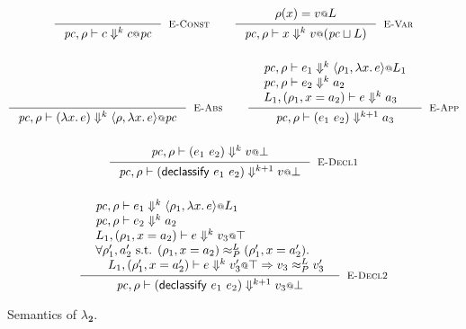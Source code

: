 \documentclass{article}
\makeatletter
\theoremstyle{definition}
\newcommand{\at}{\ensuremath{{\scriptstyle{@}}}}
\newcommand{\pc}{\ensuremath{{\mathit{pc}}}}
\makeatother
\begin{document}
\begin{figure}[ht]
  \centering
  \begin{gather*}
    \inference{}{
      \pc, \rho |- c \Downarrow^{k} c \at \pc
    }[\textsc{E-Const}]
    \qquad
    \inference{
      {\begin{array}{l}
          \rho(x) = v \at L
        \end{array}}
    }{
      \pc, \rho |- x \Downarrow^{k} v \at (\pc \sqcup L)
    }[\textsc{E-Var}]
    \\[3ex]
    \inference{}{
      \pc, \rho |- (\lambda{x}.\, e) \Downarrow^{k}
      \langle{\rho, \lambda{x}.\, e\rangle} \at \pc
    }[\textsc{E-Abs}]
    \qquad
    \inference{
      {\begin{array}{l}
          \pc, \rho |- e_1 \Downarrow^{k}
          \langle{\rho_1, \lambda{x}.\, e\rangle} \at L_1
          \\
          \pc, \rho |- e_2 \Downarrow^{k} a_2
          \\
          L_1, (\rho_1, x = a_2) |- e \Downarrow^{k} a_3
        \end{array}}
    }{
      \pc, \rho |- (e_1\ e_2) \Downarrow^{k+1} a_3
    }[\textsc{E-App}]
    \\[3ex]
    \inference{
      {\begin{array}{l}
          \pc, \rho |- (e_1\ e_2) \Downarrow^{k} v \at \bot
        \end{array}}
    }{
      \pc, \rho |- (\mathsf{declassify}\ e_1\ e_2) \Downarrow^{k+1}
      v \at \bot
    }[\textsc{E-Decl1}]
    \\[3ex]
    \inference{
      {\begin{array}{l}
          \pc, \rho |- e_1 \Downarrow^{k}
          \langle{\rho_1, \lambda{x}.\, e\rangle} \at L_1
          \\
          \pc, \rho |- e_2 \Downarrow^{k} a_2
          \\
          L_1, (\rho_1, x = a_2) |- e \Downarrow^{k} v_3 \at \top
          \\
          \forall{\rho_1', a_2' \text{ s.t. }
            (\rho_1, x = a_2) \approx^{L}_{P} (\rho_1', x = a_2')}.
          \\\quad
          L_1, (\rho_1', x = a_2') |- e \Downarrow^{k} v_3' \at \top =>
          v_3 \approx^{L}_{P} v_3'
        \end{array}}
    }{
      \pc, \rho |- (\mathsf{declassify}\ e_1\ e_2) \Downarrow^{k+1}
      v_3 \at \bot
    }[\textsc{E-Decl2}]
  \end{gather*}
  \caption{Semantics of $\lambda_{\mathbf{2}}$.}
  \label{fig:semantics}
\end{figure}
\end{document}
